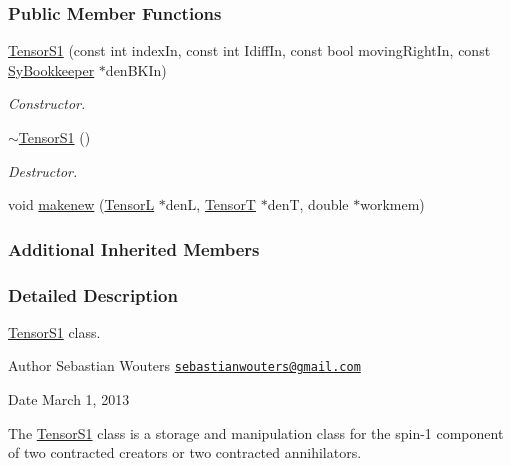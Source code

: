 \subsubsection*{Public Member Functions}
\begin{DoxyCompactItemize}
\item 
\hyperlink{classCheMPS2_1_1TensorS1_aace92b023968f3dade4111ecea330b9a}{Tensor\-S1} (const int index\-In, const int Idiff\-In, const bool moving\-Right\-In, const \hyperlink{classCheMPS2_1_1SyBookkeeper}{Sy\-Bookkeeper} $\ast$den\-B\-K\-In)
\begin{DoxyCompactList}\small\item\em Constructor. \end{DoxyCompactList}\item 
\hypertarget{classCheMPS2_1_1TensorS1_a99d2b4d55c2383fced31efe4486c54a0}{\hyperlink{classCheMPS2_1_1TensorS1_a99d2b4d55c2383fced31efe4486c54a0}{$\sim$\-Tensor\-S1} ()}\label{classCheMPS2_1_1TensorS1_a99d2b4d55c2383fced31efe4486c54a0}

\begin{DoxyCompactList}\small\item\em Destructor. \end{DoxyCompactList}\item 
void \hyperlink{classCheMPS2_1_1TensorS1_a18a3417d13fd4db5121e908586eb1d0d}{makenew} (\hyperlink{classCheMPS2_1_1TensorL}{Tensor\-L} $\ast$den\-L, \hyperlink{classCheMPS2_1_1TensorT}{Tensor\-T} $\ast$den\-T, double $\ast$workmem)
\end{DoxyCompactItemize}
\subsubsection*{Additional Inherited Members}


\subsubsection{Detailed Description}
\hyperlink{classCheMPS2_1_1TensorS1}{Tensor\-S1} class. \begin{DoxyAuthor}{Author}
Sebastian Wouters \href{mailto:sebastianwouters@gmail.com}{\tt sebastianwouters@gmail.\-com} 
\end{DoxyAuthor}
\begin{DoxyDate}{Date}
March 1, 2013
\end{DoxyDate}
The \hyperlink{classCheMPS2_1_1TensorS1}{Tensor\-S1} class is a storage and manipulation class for the spin-\/1 component of two contracted creators or two contracted annihilators. 

